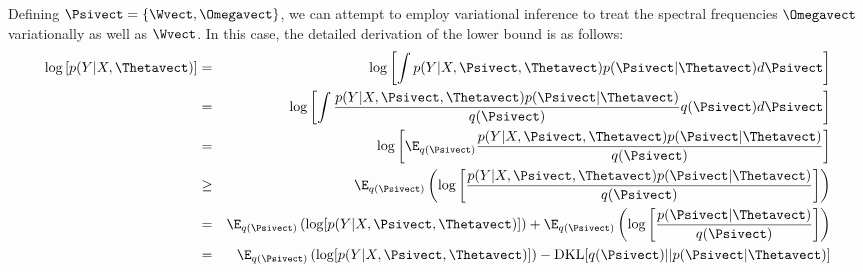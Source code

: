 Defining $\Psivect = \{\Wvect, \Omegavect\}$, we can attempt to employ variational inference to treat the spectral frequencies $\mathbf{\Omegavect}$ variationally as well as $\Wvect$. 
In this case, the detailed derivation of the lower bound is as follows:
\begin{eqnarray}
\log \left[p(Y \middle| X, \Thetavect)\right] & = & \log\left[ \int p(Y | X, \Psivect, \Thetavect) p(\Psivect | \Thetavect) d\Psivect \right] \nonumber \\
& = & \log\left[ \int \frac{p(Y | X, \Psivect, \Thetavect) p(\Psivect | \Thetavect)}{q(\Psivect)} q(\Psivect) d\Psivect \right] \nonumber \\
& = & \log\left[ \E_{q(\Psivect)} \frac{p(Y | X, \Psivect, \Thetavect) p(\Psivect | \Thetavect)}{q(\Psivect)} \right] \nonumber \\
& \geq & \E_{q(\Psivect)} \left( \log\left[ \frac{p(Y | X, \Psivect, \Thetavect) p(\Psivect | \Thetavect)}{q(\Psivect)} \right] \right) \nonumber \\
& = & \E_{q(\Psivect)} \left( \log[ p(Y | X, \Psivect, \Thetavect) ] \right) + \E_{q(\Psivect)} \left( \log\left[\frac{ p(\Psivect | \Thetavect)}{q(\Psivect)} \right] \right) \nonumber \\
& = & \E_{q(\Psivect)} \left( \log[ p(Y | X, \Psivect, \Thetavect) ] \right) - \mathrm{DKL}[q(\Psivect) || p(\Psivect | \Thetavect)] \nonumber
\end{eqnarray}

